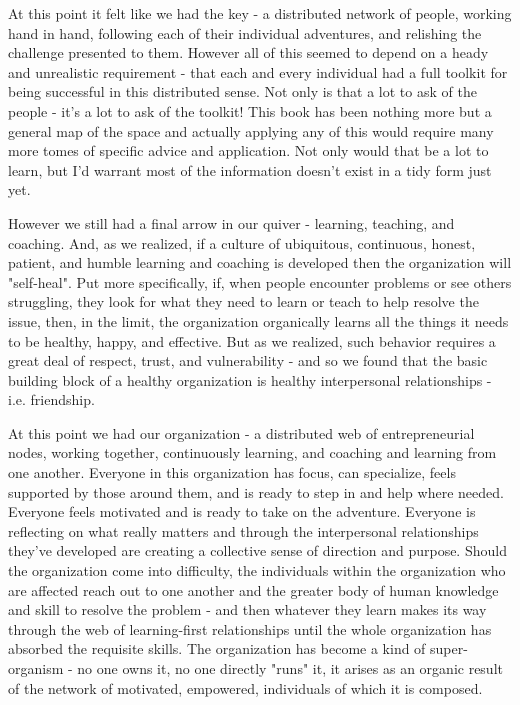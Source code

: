 \documentclass[11pt,a5paper]{book}
\begin{document}
At this point it felt like we had the key - a distributed network of people, working hand in hand, following each of their individual adventures, and relishing the challenge presented to them. However all of this seemed to depend on a heady and unrealistic requirement - that each and every individual had a full toolkit for being successful in this distributed sense. Not only is that a lot to ask of the people - it's a lot to ask of the toolkit! This book has been nothing more but a general map of the space and actually applying any of this would require many more tomes of specific advice and application. Not only would that be a lot to learn, but I'd warrant most of the information doesn't exist in a tidy form just yet. 
\newline

However we still had a final arrow in our quiver - learning, teaching, and coaching. And, as we realized, if a culture of ubiquitous, continuous, honest, patient, and humble learning and coaching is developed then the organization will "self-heal". Put more specifically, if, when people encounter problems or see others struggling, they look for what they need to learn or teach to help resolve the issue, then, in the limit, the organization organically learns all the things it needs to be healthy, happy, and effective. But as we realized, such behavior requires a great deal of respect, trust, and vulnerability - and so we found that the basic building block of a healthy organization is healthy interpersonal relationships - i.e. friendship.
\newline

At this point we had our organization - a distributed web of entrepreneurial nodes, working together, continuously learning, and coaching and learning from one another. Everyone in this organization has focus, can specialize, feels supported by those around them, and is ready to step in and help where needed. Everyone feels motivated and is ready to take on the adventure. Everyone is reflecting on what really matters and through the interpersonal relationships they've developed are creating a collective sense of direction and purpose. Should the organization come into difficulty, the individuals within the organization who are affected reach out to one another and the greater body of human knowledge and skill to resolve the problem - and then whatever they learn makes its way through the web of learning-first relationships until the whole organization has absorbed the requisite skills. The organization has become a kind of super-organism - no one owns it, no one directly "runs" it, it arises as an organic result of the network of motivated, empowered, individuals of which it is composed. 
\newline
\end{document}
